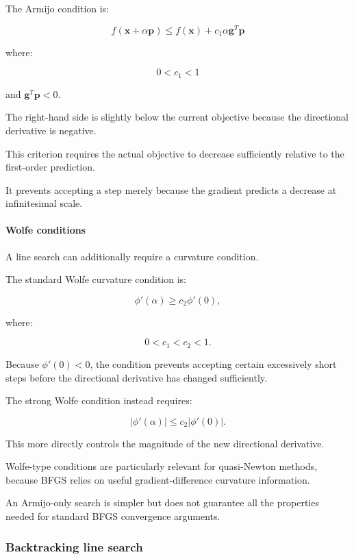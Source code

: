The Armijo condition is:

\[
\boxed{ f(\mathbf x+\alpha\mathbf p) \le f(\mathbf x)+c_1\alpha\mathbf g^T\mathbf p }
\]

where:

\[
0<c_1<1
\]

and \(\mathbf g^T\mathbf p<0\).

The right-hand side is slightly below the current objective because the directional derivative is negative.

This criterion requires the actual objective to decrease sufficiently relative to the first-order prediction.

It prevents accepting a step merely because the gradient predicts a decrease at infinitesimal scale.

\paragraph{Wolfe conditions}\label{02-foundations-ii-ch026-wolfe-conditions}

A line search can additionally require a curvature condition.

The standard Wolfe curvature condition is:

\[
\phi'(\alpha)\ge c_2\phi'(0),
\]

where:

\[
0<c_1<c_2<1.
\]

Because \(\phi'(0)<0\), the condition prevents accepting certain excessively short steps before the directional derivative has changed sufficiently.

The strong Wolfe condition instead requires:

\[
\boxed{ |\phi'(\alpha)|\le c_2|\phi'(0)| }.
\]

This more directly controls the magnitude of the new directional derivative.

Wolfe-type conditions are particularly relevant for quasi-Newton methods, because BFGS relies on useful gradient-difference curvature information.

An Armijo-only search is simpler but does not guarantee all the properties needed for standard BFGS convergence arguments.

\subsubsection{Backtracking line search}\label{02-foundations-ii-ch026-backtracking-line-search}

